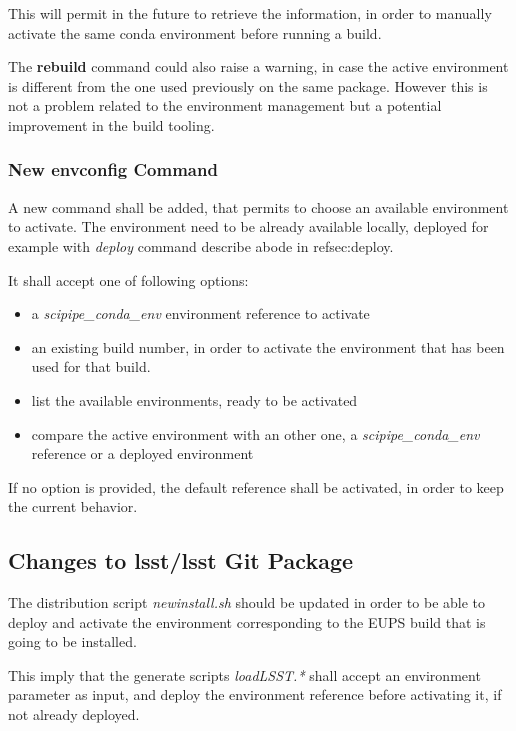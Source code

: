 This will permit in the future to retrieve the information, in order to manually activate the same conda environment before running a build.

The \textbf{rebuild} command could also raise a warning, in case the active environment is different from the one used previously on the same package.
However this is not a problem related to the environment management but a potential improvement in the build tooling.


\subsubsection{New envconfig Command} \label{sec:envconfig}

A new command shall be added, that permits to choose an available environment to activate.
The environment need to be already available locally, deployed for example with \textit{deploy} command describe abode in ref{sec:deploy}.

It shall accept one of following options:

\begin{itemize}
\item a \textit{scipipe\_conda\_env} environment reference to activate
\item an existing build number, in order to activate the environment that has been used for that build.
\item list the available environments, ready to be activated
\item compare the active environment with an other one, a \textit{scipipe\_conda\_env} reference or a deployed environment
\end{itemize}

If no option is provided, the default reference shall be activated, in order to keep the current behavior.


\subsection{Changes to lsst/lsst Git Package} \label{sec:newinstall}

The distribution script \textit{newinstall.sh} should be updated in order to be able to deploy and activate the environment corresponding to the EUPS build that is going to be installed.

This imply that the generate scripts \textit{loadLSST.*} shall accept an environment parameter as input, and deploy the environment reference before activating it, if not already deployed.



